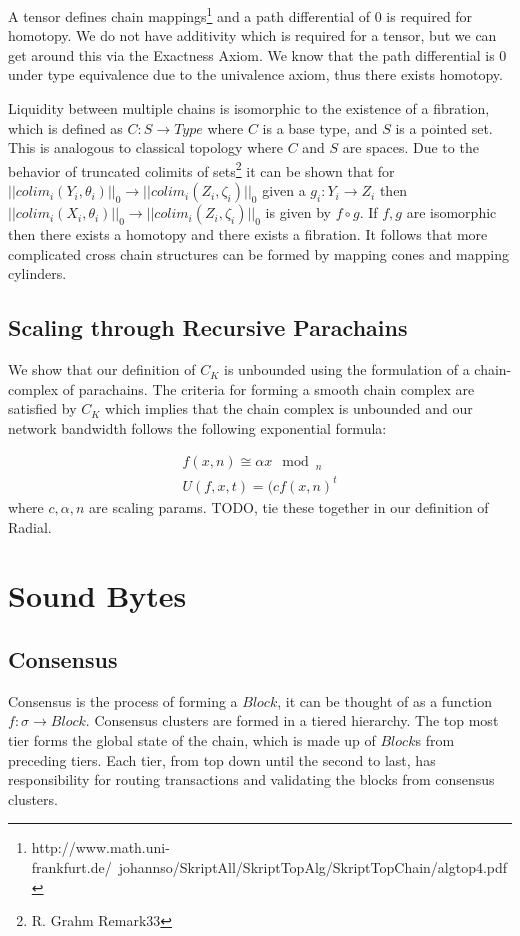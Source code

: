 \documentclass{article}
\begin{document}
A tensor defines chain mappings\footnote{http://www.math.uni-frankfurt.de/~johannso/SkriptAll/SkriptTopAlg/SkriptTopChain/algtop4.pdf} and a path differential of 0 is required for homotopy. We do not have additivity which is required for a tensor, but we can get around this via the Exactness Axiom. We know that the path differential is 0 under type equivalence due to the univalence axiom, thus there exists homotopy.

Liquidity between multiple chains is isomorphic to the existence of a fibration, which is defined as $C: S \rightarrow Type$ where $C$ is a base type, and $S$ is a pointed set. This is analogous to classical topology where $C$ and $S$ are spaces. Due to the behavior of truncated colimits of sets\footnote{R. Grahm Remark33} it can be shown that for $ || colim_i (Y_i,\theta_i) ||_0 \rightarrow || colim_i (Z_i,\zeta_i) ||_0$ given a $g_i: Y_i  \rightarrow Z_i$ then $|| colim_i (X_i,\theta_i) ||_0 \rightarrow || colim_i (Z_i,\zeta_i) ||_0$ is given by $f \circ g$. If $f,g$ are isomorphic then there exists a homotopy and there exists a fibration. It follows that more complicated cross chain structures can be formed by mapping cones and mapping cylinders.

\subsection{Scaling through Recursive Parachains}
We show that our definition of $C_K$ is unbounded using the formulation of a chain-complex of parachains. The criteria for forming a smooth chain complex are satisfied by $C_K$ which implies that the chain complex is unbounded and our network bandwidth follows the following exponential formula:

\begin{equation} \label{eq1}
\begin{split}
f(x, n) \cong \alpha x \mod_n \\
U(f, x, t) = (c f(x, n)^t
\end{split}
\end{equation}
where $c, \alpha, n$ are scaling params. TODO, tie these together in our definition of Radial.

\section{Sound Bytes}
\subsection{Consensus}
Consensus is the process of forming a $Block$, it can be thought of as a function $f: \sigma \rightarrow Block$. Consensus clusters are formed in a tiered hierarchy. The top most tier forms the global state of the chain, which is made up of $Block$s from preceding tiers. Each tier, from top down until the second to last, has responsibility for routing transactions and validating the blocks from consensus clusters. 
\end{document}
